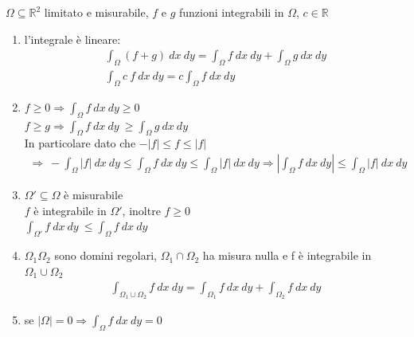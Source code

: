 \documentclass[a4paper, oneside]{article}
\begin{document}
\begin{proposition}
         $\Omega \subseteq \mathbb{R}^2$ limitato e misurabile, $f$ e $g$ funzioni integrabili in $\Omega$, $c \in \mathbb{R}$\\
    \begin{enumerate}[$a)$]
        \item l'integrale è lineare:
        \begin{gather*}
            \int_{\Omega} (f+g) \ dx \ dy = \int_{\Omega} f \ dx \ dy + \int_{\Omega} g \ dx \ dy\\
            \int_{\Omega} c \ f \ dx \ dy = c \int_{\Omega} f \ dx \ dy
        \end{gather*}
        \item {} $f\geq 0 \Rightarrow \int_{\Omega} f \ dx \ dy \geq 0$\\
         $f \geq g \Rightarrow \int_{\Omega} f \ dx \ dy \ \geq \int_{\Omega} g \ dx \ dy$\\
        In particolare dato che $-|f| \leq f \leq |f|$
        \begin{gather*}
            \Rightarrow \ -\int_{\Omega} |f| \ dx \ dy \leq \int_{\Omega} f \ dx \ dy \leq \int_{\Omega} |f| \ dx \ dy \Rightarrow \left| \int_{\Omega} f \ dx \ dy \right| \leq \int_{\Omega} |f| \ dx \ dy
        \end{gather*}
        \item {} $\Omega' \subseteq \Omega$ è misurabile \\
         $f$ è integrabile in $\Omega'$,  inoltre $f \geq 0$ \\
         $\int_{\Omega'} f \ dx \ dy \ \leq \int_{\Omega} f \ dx \ dy$
        \item{} $\Omega_1 \Omega_2$ sono domini regolari, $\Omega_1 \cap \Omega_2$ ha misura nulla e f è integrabile in $\Omega_1 \cup \Omega_2$\\
        \begin{gather*}
            \int_{\Omega_1 \cup \Omega_2} f \ dx \ dy = \int_{\Omega_1} f \ dx \ dy + \int_{\Omega_2} f \ dx \ dy
        \end{gather*}
        \item se $|\Omega| = 0 \Rightarrow \int_{\Omega} f \ dx \ dy = 0$
    \end{enumerate}
\end{proposition}
\end{document}
